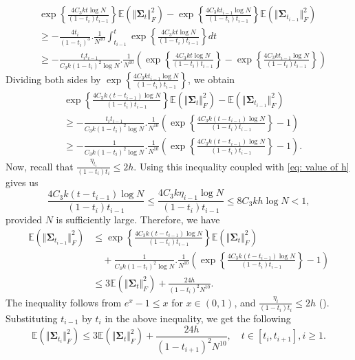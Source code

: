 \documentclass{article}
\theoremstyle{plain}
\theoremstyle{definition}
\theoremstyle{remark}
\def\bbE{\mathbb{E}}
\def\bSigma{{\boldsymbol\Sigma}}
\def\Norm#1{\Vert#1\Vert}
\begin{document}
\begin{align*}
    & \exp\left\{\frac{4 C_3 k t\log N}{(1-t_i)t_{i-1}}\right\} \bbE (\Norm{\bSigma_{t}}_F^2) -  \exp\left\{\frac{4 C_3 k t_{i-1}\log N}{(1-t_i)t_{i-1}}\right\} \bbE (\Norm{\bSigma_{t_{i-1}}}_F^2)\\
    & \ge - \frac{4t_i}{(1-t_{i})^3}. \frac{1}{N^{10}} \int_{t_{i-1}}^t \exp\left\{\frac{4 C_3 k t\log N}{(1-t_i)t_{i-1}}\right\}dt\\
    & \ge - \frac{t_i t_{i-1}}{C_3 k (1-t_{i})^2 \log N}. \frac{1}{N^{10}} \left(\exp\left\{\frac{4 C_3 k t\log N}{(1-t_i)t_{i-1}}\right\} - \exp\left\{\frac{4 C_3 k t_{i-1}\log N}{(1-t_i)t_{i-1}}\right\}\right)
\end{align*}
Dividing both sides by $\exp\left\{\frac{4 C_3 k t_{i-1}\log N}{(1-t_i)t_{i-1}}\right\}$, we obtain
\begin{align*}
    & \exp\left\{\frac{4 C_3 k (t-t_{i-1})\log N}{(1-t_i)t_{i-1}}\right\} \bbE (\Norm{\bSigma_{t}}_F^2) -  \bbE (\Norm{\bSigma_{t_{i-1}}}_F^2)\\
    & \ge - \frac{t_i t_{i-1}}{C_3 k (1-t_{i})^2 \log N}. \frac{1}{N^{10}} \left(\exp\left\{\frac{4 C_3 k (t-t_{i-1})\log N}{(1-t_i)t_{i-1}}\right\} -1\right)\\
    & \ge -\frac{1}{C_3 k (1-t_i)^2 \log N}. \frac{1}{N^{10}} \left(\exp\left\{\frac{4 C_3 k (t-t_{i-1})\log N}{(1-t_i)t_{i-1}}\right\} -1\right).
\end{align*}
Now, recall that $\frac{\eta_{t_i}}{(1-t_i)t_i} \le 2 h$. Using this inequality coupled with \eqref{eq: value of h} gives us
\[
\frac{4 C_3 k (t-t_{i-1})\log N}{(1-t_i)t_{i-1}} \le \frac{4 C_3 k \eta_{i-1}\log N}{(1-t_i)t_{i-1}} \le 8 C_3 k h \log N< 1,
\]
provided $N$ is sufficiently large. Therefore, we have 
\begin{align*}
     \bbE (\Norm{\bSigma_{t_{i-1}}}_F^2) & \le \exp\left\{\frac{4 C_3 k (t-t_{i-1})\log N}{(1-t_i)t_{i-1}}\right\} \bbE (\Norm{\bSigma_{t}}_F^2)\\
     & \quad + \frac{1}{C_3 k (1-t_i)^2 \log N}. \frac{1}{N^{10}} \left(\exp\left\{\frac{4 C_3 k (t-t_{i-1})\log N}{(1-t_i)t_{i-1}}\right\} -1\right)\\
    & \le 3 \bbE (\Norm{\bSigma_{t}}_F^2) + \frac{24h }{(1-t_i)^2 N^{10}}.
\end{align*}
The inequality follows from $e^x -1 \le x$ for $ x\in (0,1)$, and $\frac{\eta_{i}}{(1-t_i)t_i} \le 2 h$ ().
Substituting $t_{i-1}$ by $t_{i}$ in the above inequality, we get the following 
\[
\bbE (\Norm{\bSigma_{t_{i}}}_F^2) \le 3 \bbE (\Norm{\bSigma_{t}}_F^2) + \frac{24h }{(1-t_{i+1})^2 N^{10}}, \quad t \in [t_i , t_{i+1}], i \ge 1.
\]
\end{document}
